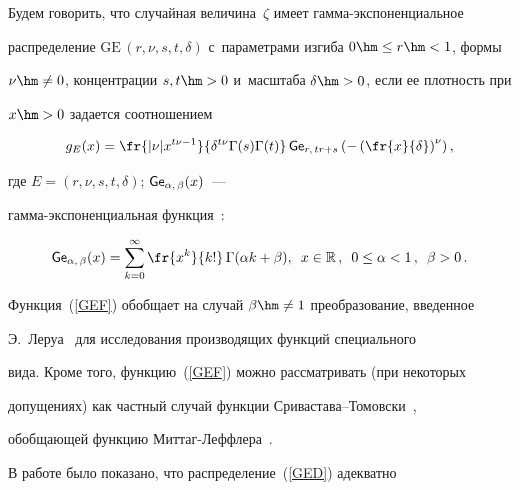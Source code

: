 Будем говорить, что случайная величина~$\zeta$ имеет гам\-ма-экс\-по\-нен\-ци\-аль\-ное 


распределение $\mathrm{GE}\,(r,\nu,s,t,\delta)$ с~параметрами изгиба $0\hm\le r\hm<1$, формы 


$\nu\hm\neq0$, концентрации $s,t\hm>0$ и~масштаба $\delta\hm>0$, если ее плот\-ность при 


$x\hm>0$ задается соотношением


\begin{equation}


\label{GED}


g_E(x) =


\fr{|\nu|x^{t\nu-1}}{\delta^{t\nu}\Gamma(s)\Gamma(t)}\,


   {\sf Ge}_{r,\, tr+s}\left(-\left(\fr{x}{\delta}\right )^{\nu}\right),


\end{equation}


где $E=(r,\nu,s,t,\delta)$;  ${\sf Ge}_{\alpha,\, \beta} (x)$~--- 


гамма-экс\-по\-нен\-ци\-аль\-ная функция~\cite{KuTi2017}:


\begin{equation}


\label{GEF}


{\sf Ge}_{\alpha,\, \beta} (x) = \sum\limits_{k=0}^{\infty}\fr{x^k}{k!}\, \Gamma(\alpha k + 


\beta), \enskip x\in\mathbb{R}\,, \enskip 0\le\alpha<1\,, \enskip \beta> 0\,.


\end{equation}











Функция~(\ref{GEF}) обобщает на случай $\beta\hm\neq1$ преобразование, введенное 


Э.~Леруа~\cite{LeRoy1900_1} для исследования производящих функций специального 


вида. Кроме того, функцию~(\ref{GEF}) можно рас\-смат\-ри\-вать (при некоторых 


допущениях) как частный случай функции Сри\-ва\-ста\-ва--То\-мов\-ски~\cite{SrTo2009}, 


обобщающей функцию Мит\-таг-Леф\-фле\-ра~\cite{GoKiMaRo2014}.





В работе было показано, что распределение~(\ref{GED}) адекватно 


